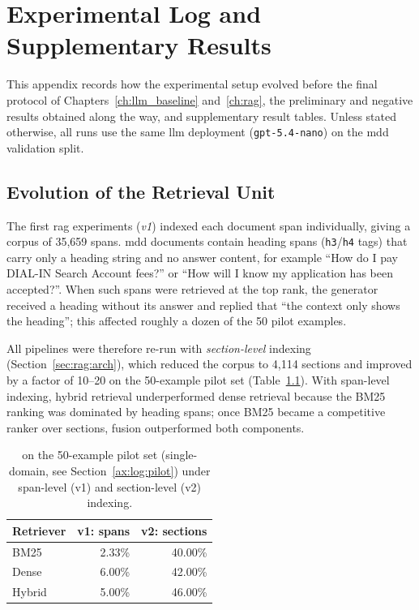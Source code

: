 
\chapter{Experimental Log and Supplementary Results}\label{ax:log}

This appendix records how the experimental setup evolved before the final protocol
of Chapters~\ref{ch:llm_baseline} and~\ref{ch:rag}, the preliminary and negative
results obtained along the way, and supplementary result tables. Unless stated
otherwise, all runs use the same \gls{llm} deployment (\texttt{gpt-5.4-nano}) on the
\gls{mdd} validation split.


\section{Evolution of the Retrieval Unit}\label{ax:log:indexing}

The first \gls{rag} experiments (\emph{v1}) indexed each document span
individually, giving a corpus of 35{,}659 spans. \gls{mdd} documents contain
heading spans (\texttt{h3}/\texttt{h4} tags) that carry only a heading string and no
answer content, for example ``How do I pay DIAL-IN Search Account fees?'' or ``How
will I know my application has been accepted?''. When such spans were retrieved at
the top rank, the generator received a heading without its answer and replied that
``the context only shows the heading''; this affected roughly a dozen of the 50 pilot
examples.

All pipelines were therefore re-run with \emph{section-level} indexing
(Section~\ref{sec:rag:arch}), which reduced the corpus to 4{,}114 sections and
improved  by a factor of 10--20 on the 50-example pilot set
(Table~\ref{tab:log:indexing}). With span-level indexing, hybrid retrieval
underperformed dense retrieval because the BM25 ranking was dominated by heading
spans; once BM25 became a competitive ranker over sections, fusion outperformed both
components.

\begin{table}[ht]
    \centering
    \caption{ on the 50-example pilot set (single-domain, see
             Section~\ref{ax:log:pilot}) under span-level (v1) and section-level
             (v2) indexing.}
    \label{tab:log:indexing}
    \begin{tabular}{lrr}
        \toprule
        Retriever & v1: spans & v2: sections \\
        \midrule
        BM25   & 2.33\% & 40.00\% \\
        Dense  & 6.00\% & 42.00\% \\
        Hybrid & 5.00\% & 46.00\% \\
        \bottomrule
    \end{tabular}
\end{table}


